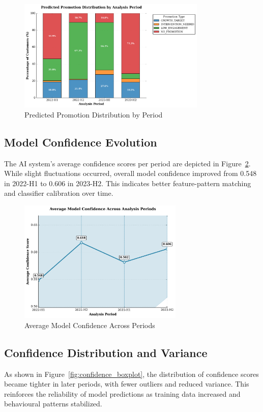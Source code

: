 \documentclass[12pt,a4paper]{report}
\begin{document}
\begin{figure}[H]
    \centering
    \includegraphics[width=0.8\textwidth]{figures/promotion_by_period.png}
    \caption{Predicted Promotion Distribution by Period}
    \label{fig:promo_by_period}
\end{figure}

\subsection*{Model Confidence Evolution}
The AI system’s average confidence scores per period are depicted in Figure~\ref{fig:confidence_line}. While slight fluctuations occurred, overall model confidence improved from 0.548 in 2022-H1 to 0.606 in 2023-H2. This indicates better feature-pattern matching and classifier calibration over time.

\begin{figure}[H]
    \centering
    \includegraphics[width=0.7\textwidth]{figures/confidence_lineplot.png}
    \caption{Average Model Confidence Across Periods}
    \label{fig:confidence_line}
\end{figure}

\subsection*{Confidence Distribution and Variance}
As shown in Figure~\ref{fig:confidence_boxplot}, the distribution of confidence scores became tighter in later periods, with fewer outliers and reduced variance. This reinforces the reliability of model predictions as training data increased and behavioural patterns stabilized.
\end{document}
